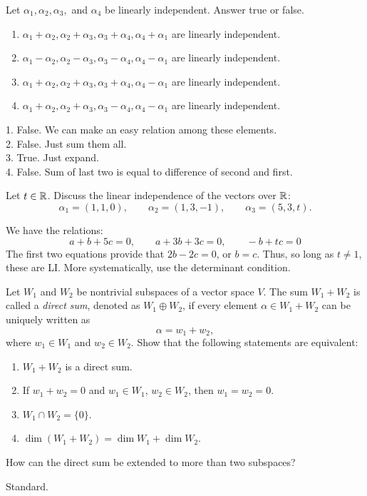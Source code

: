 \begin{exercise}
    Let $\alpha_1,\alpha_2,\alpha_3,$ and $\alpha_4$ be linearly independent. 
    Answer true or false.
    \begin{enumerate}
        \item $\alpha_1+\alpha_2, \alpha_2+\alpha_3, \alpha_3+\alpha_4, \alpha_4+\alpha_1$ are linearly independent.
        \item $\alpha_1-\alpha_2, \alpha_2-\alpha_3, \alpha_3-\alpha_4, \alpha_4-\alpha_1$ are linearly independent.
        \item $\alpha_1+\alpha_2, \alpha_2+\alpha_3, \alpha_3+\alpha_4, \alpha_4-\alpha_1$ are linearly independent.
        \item $\alpha_1+\alpha_2, \alpha_2+\alpha_3, \alpha_3-\alpha_4, \alpha_4-\alpha_1$ are linearly independent.
    \end{enumerate}
\end{exercise}
\begin{solution}
    1. False. We can make an easy relation among these elements.\\

    2. False. Just sum them all. \\

    3. True. Just expand. \\

    4. False. Sum of last two is equal to difference of second and first.
\end{solution}

\begin{exercise}
Let $t \in \mathbb{R}$. Discuss the linear independence of the vectors over $\mathbb{R}$:
\[
\alpha_1=(1,1,0), \qquad
\alpha_2=(1,3,-1), \qquad
\alpha_3=(5,3,t).
\]
\end{exercise}
\begin{solution}
We have the relations:
\[
a + b + 5c = 0, \qquad a + 3b + 3c = 0, \qquad -b + tc = 0
\]
The first two equations provide that $2b - 2c = 0$, or $b = c$. Thus,
so long as $t \neq 1$, these are LI. 
More systematically, use the determinant condition.
\end{solution}

\begin{exercise}
Let $W_1$ and $W_2$ be nontrivial subspaces of a vector space $V$. The sum
$W_1+W_2$ is called a \emph{direct sum}, denoted as $W_1\oplus W_2$, if every element
$\alpha\in W_1+W_2$ can be uniquely written as
\[
\alpha=w_1+w_2,
\]
where $w_1\in W_1$ and $w_2\in W_2$. Show that the following statements are equivalent:
\begin{enumerate}
\item $W_1+W_2$ is a direct sum.    
\item If $w_1+w_2=0$ and $w_1\in W_1$, $w_2\in W_2$, then $w_1 = w_2 = 0$.
\item $W_1\cap W_2=\{0\}$.
\item $\dim(W_1+W_2)=\dim W_1+\dim W_2$.
\end{enumerate}

How can the direct sum be extended to more than two subspaces?
\end{exercise}
\begin{solution}
Standard.
\end{solution}

